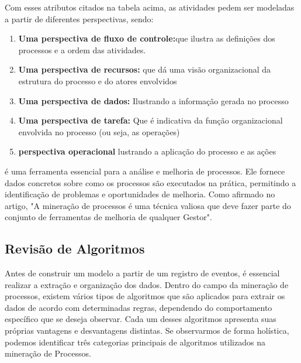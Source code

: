 \documentclass[tcc2]{classe_uftex/uftex}
\begin{document}
\vspace{1cm}

Com esses atributos citados na tabela acima, as atividades pedem ser modeladas a partir de diferentes perspectivas\cite{greyling2017application}, sendo:

\begin{enumerate}
    \item \textbf{Uma perspectiva de fluxo de controle:}que ilustra as definições dos processos e a ordem das atividades.
    
    \item \textbf{Uma perspectiva de recursos:} que dá uma visão organizacional da estrutura do processo e do atores envolvidos
    
    \item \textbf{Uma perspectiva de dados:} Ilustrando a informação gerada no processo

     \item \textbf{Uma perspectiva de tarefa:} Que é indicativa da função organizacional envolvida no processo (ou seja, as operações)

      \item \textbf{perspectiva operacional} lustrando a aplicação do processo e as ações
\end{enumerate}

 é uma ferramenta essencial para a análise e melhoria de processos. Ele fornece dados concretos sobre como os processos são executados na prática, permitindo a identificação de problemas e oportunidades de melhoria. Como afirmado no artigo, "A mineração de processos é uma técnica valiosa que deve fazer parte do conjunto de ferramentas de melhoria de qualquer Gestor"\cite{greyling2017application}.


\subsection{Revisão de Algoritmos}

Antes de construir um modelo a partir de um registro de eventos, é essencial realizar a extração e organização dos dados. Dentro do campo da mineração de processos, existem vários tipos de algoritmos que são aplicados para extrair os dados de acordo com determinadas regras, dependendo do comportamento específico que se deseja observar. Cada um desses algoritmos apresenta suas próprias vantagens e desvantagens distintas. Se observarmos de forma holística, podemos identificar três categorias principais de algoritmos utilizados na mineração de Processos.
\end{document}
